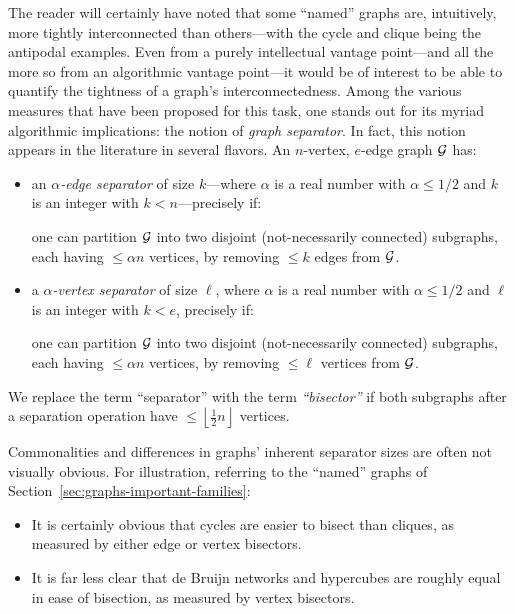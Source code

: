 \noindent
The reader will certainly have noted that some ``named'' graphs are, intuitively, more tightly interconnected than others---with the cycle and clique being the antipodal examples.  Even from a purely intellectual vantage point---and all the more so from an algorithmic vantage point---it would be of interest to be able to quantify the tightness of a graph's interconnectedness.  Among  the various measures that have been proposed for this task, one stands out for its myriad algorithmic implications: the notion of {\it graph separator}.  In fact, this notion appears in the literature in several flavors.  An $n$-vertex, $e$-edge graph $\mbox{$\cal G$}$ has:
\begin{itemize}
\item
an {\it $\alpha$-edge separator} of size $k$---where $\alpha$ is a real number with $\alpha \leq 1/2$  and $k$ is an integer with $k < n$---precisely if:


\smallskip

one can partition $\mbox{$\cal G$}$ into two disjoint (not-necessarily connected) subgraphs, each having 
$\leq \alpha n$ vertices, by removing $\leq k$ edges from $\mbox{$\cal G$}$.

\item
a {\it $\alpha$-vertex separator} of size $\ell$, where $\alpha$ is a real number with  $\alpha \leq 1/2$ and $\ell$ is an integer with $k < e$, precisely if:


\smallskip

one can partition $\mbox{$\cal G$}$ into two disjoint (not-necessarily connected) subgraphs, each having
$\leq \alpha n$ vertices, by removing $\leq \ell$ vertices from $\mbox{$\cal G$}$.
\end{itemize}
We replace the term ``separator'' with the term {\em ``bisector''} if both subgraphs after a separation operation have $\leq \left\lfloor \frac{1}{2} n \right\rfloor$ vertices.

 

\medskip

Commonalities and differences in graphs' inherent separator sizes are often not visually obvious.  For illustration, referring to the ``named'' graphs of Section~\ref{sec:graphs-important-families}:
\begin{itemize}
\item
It is certainly obvious that cycles are easier to bisect than cliques, as measured by either edge or vertex bisectors.
\item
It is far less clear that de Bruijn networks and hypercubes are roughly equal in ease of bisection, as measured by vertex bisectors.
\end{itemize}

